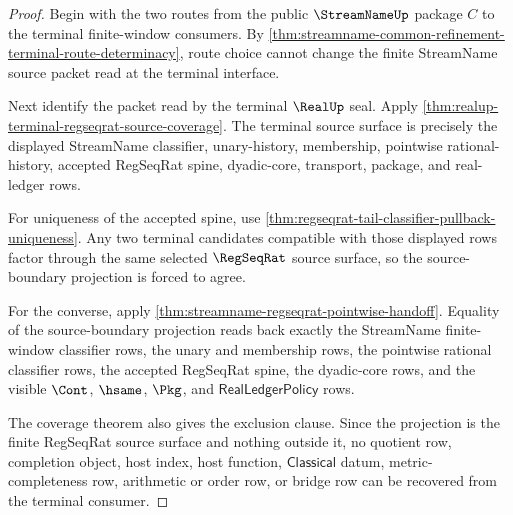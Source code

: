 \begin{proof}
Begin with the two routes from the public $\StreamNameUp$ package $C$ to the
terminal finite-window consumers. By
\autoref{thm:streamname-common-refinement-terminal-route-determinacy}, route
choice cannot change the finite StreamName source packet read at the terminal
interface.

Next identify the packet read by the terminal $\RealUp$ seal. Apply
\autoref{thm:realup-terminal-regseqrat-source-coverage}. The terminal source
surface is precisely the displayed StreamName classifier, unary-history,
membership, pointwise rational-history, accepted RegSeqRat spine, dyadic-core,
transport, package, and real-ledger rows.

For uniqueness of the accepted spine, use
\autoref{thm:regseqrat-tail-classifier-pullback-uniqueness}. Any two terminal
candidates compatible with those displayed rows factor through the same
selected $\RegSeqRat$ source surface, so the source-boundary projection is
forced to agree.

For the converse, apply
\autoref{thm:streamname-regseqrat-pointwise-handoff}. Equality of the
source-boundary projection reads back exactly the StreamName finite-window
classifier rows, the unary and membership rows, the pointwise rational
classifier rows, the accepted RegSeqRat spine, the dyadic-core rows, and the
visible $\Cont$, $\hsame$, $\Pkg$, and $\mathsf{RealLedgerPolicy}$ rows.

The coverage theorem also gives the exclusion clause. Since the projection is
the finite RegSeqRat source surface and nothing outside it, no quotient row,
completion object, host index, host function, $\mathsf{Classical}$ datum,
metric-completeness row, arithmetic or order row, or bridge row can be
recovered from the terminal consumer.
\end{proof}

